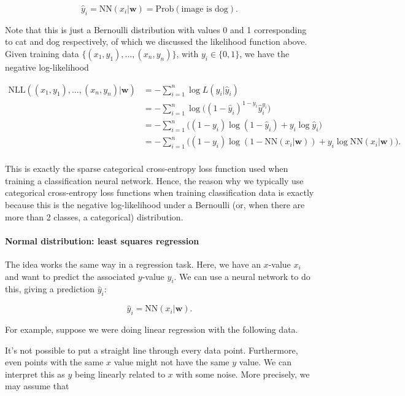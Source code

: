 \documentclass[11pt]{article}
\begin{document}
\[
\hat{y}_i = \text{NN}(x_i | \mathbf{w}) = \text{Prob}(\text{image is dog}).
\]

Note that this is just a Bernoulli distribution with values 0 and 1
corresponding to cat and dog respectively, of which we discussed the
likelihood function above. Given training data
\(\{(x_1, y_1), \ldots, (x_n, y_n)\}\), with \(y_i \in \{0, 1\}\), we
have the negative log-likelihood

\[
\begin{align}
\text{NLL}((x_1, y_1), \ldots, (x_n, y_n) | \mathbf{w}) &= - \sum_{i=1}^n \log L(y_i | \hat{y}_i) \\
&= - \sum_{i=1}^n \log \big( (1 - \hat{y}_i)^{1 - y_i} \hat{y}_i^{y_i} \big) \\
&= - \sum_{i=1}^n \big( (1 - y_i) \log(1 - \hat{y}_i) + y_i \log \hat{y}_i \big) \\
&= - \sum_{i=1}^n \big( (1 - y_i) \log(1 - \text{NN}(x_i | \mathbf{w})) + y_i \log \text{NN}(x_i | \mathbf{w}) \big). \\
\end{align}
\]

This is exactly the sparse categorical cross-entropy loss function used
when training a classification neural network. Hence, the reason why we
typically use categorical cross-entropy loss functions when training
classification data is exactly because this is the negative
log-likelihood under a Bernoulli (or, when there are more than 2
classes, a categorical) distribution.

    \hypertarget{normal-distribution-least-squares-regression}{%
\paragraph{Normal distribution: least squares
regression}\label{normal-distribution-least-squares-regression}}

The idea works the same way in a regression task. Here, we have an
\(x\)-value \(x_i\) and want to predict the associated \(y\)-value
\(y_i\). We can use a neural network to do this, giving a prediction
\(\hat{y}_i\):

\[
\hat{y}_i = \text{NN}(x_i | \mathbf{w}).
\]

For example, suppose we were doing linear regression with the following
data.

    It's not possible to put a straight line through every data point.
Furthermore, even points with the same \(x\) value might not have the
same \(y\) value. We can interpret this as \(y\) being linearly related
to \(x\) with some noise. More precisely, we may assume that
\end{document}

